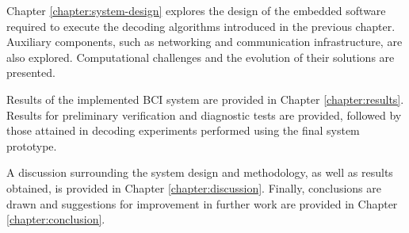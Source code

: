 Chapter \ref{chapter:system-design} explores the design of the embedded software required to execute the decoding algorithms introduced in the previous chapter. Auxiliary components, such as networking and communication infrastructure, are also explored. Computational challenges and the evolution of their solutions are presented. 

Results of the implemented BCI system are provided in Chapter \ref{chapter:results}. Results for preliminary verification and diagnostic tests are provided, followed by those attained in decoding experiments performed using the final system prototype. 

A discussion surrounding the system design and methodology, as well as results obtained, is provided in Chapter \ref{chapter:discussion}. Finally, conclusions are drawn and suggestions for improvement in further work are provided in Chapter \ref{chapter:conclusion}. 